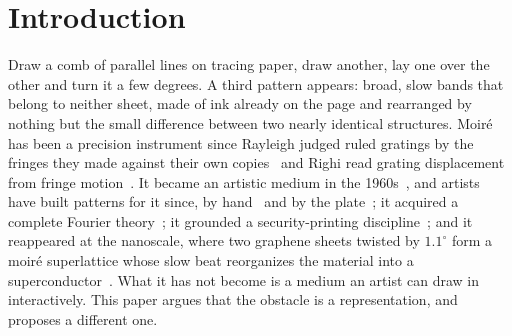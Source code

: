 \section{Introduction}
\label{sec:intro}

Draw a comb of parallel lines on tracing paper, draw another, lay one over the
other and turn it a few degrees. A third pattern appears: broad, slow bands that
belong to neither sheet, made of ink already on the page and rearranged by
nothing but the small difference between two nearly identical structures.
Moir\'e has been a precision instrument since Rayleigh judged ruled gratings by
the fringes they made against their own copies~\cite{Rayleigh1874Gratings} and
Righi read grating displacement from fringe
motion~\cite{Righi1887Sovrapposizione}. It became an artistic medium in the
1960s~\cite{Oster1963Moire, Oster1965Optical, Seitz1965Responsive}, and artists
have built patterns for it since, by hand~\cite{Watkins1982Kinetic} and by the
plate~\cite{Nicolai2010Index}; it acquired a complete Fourier
theory~\cite{Amidror2009Theory}; it grounded a security-printing
discipline~\cite{Hersch2004Band, Chosson2014Beating}; and it reappeared at the
nanoscale, where two graphene sheets twisted by $1.1^\circ$ form a moir\'e
superlattice whose slow beat reorganizes the material into a
superconductor~\cite{Bistritzer2011Moire, Cao2018Magic}. What it has not become
is a medium an artist can draw in interactively. This paper argues that the
obstacle is a representation, and proposes a different one.

